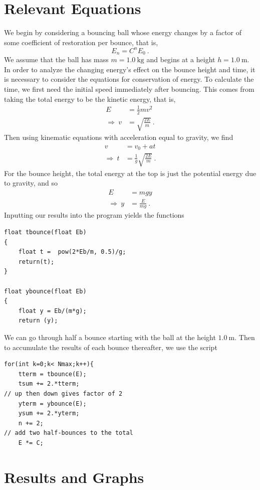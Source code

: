 \documentclass[aps,prl,twocolumn,superscriptaddress]{revtex4-1}
\begin{document}
\section{Relevant Equations}
We begin by considering a bouncing ball whose energy changes by a factor of some coefficient of restoration per bounce, that is,
\begin{equation}
	E_n = C^n E_0 ~.
\end{equation}
We assume that the ball has mass $m = \SI{1.0}{\kg}$ and begins at a height $h = \SI{1.0}{\m}$. In order to analyze the changing energy's effect on the bounce height and time, it is necessary to consider the equations for conservation of energy. To calculate the time, we first need the initial speed immediately after bouncing. This comes from taking the total energy to be the kinetic energy, that is,
\begin{align}
	E &= \frac{1}{2}mv^2 \\
	\Rightarrow ~ v &= \sqrt{\frac{2E}{m}} ~.
\end{align}
Then using kinematic equations with acceleration equal to gravity, we find
\begin{align}
	v &= v_0 + at \\
	\Rightarrow ~ t &= \frac{1}{g} \sqrt{\frac{2E}{m}} ~.
\end{align}
For the bounce height, the total energy at the top is just the potential energy due to gravity, and so
\begin{align}
	E &= mgy \\
	\Rightarrow ~ y &= \frac{E}{mg} ~.
\end{align}
Inputting our results into the program yields the functions
\begin{lstlisting}
float tbounce(float Eb) 
{
    float t =  pow(2*Eb/m, 0.5)/g;
    return(t);
}

float ybounce(float Eb)
{
    float y = Eb/(m*g);
    return (y);
\end{lstlisting}
We can go through half a bounce starting with the ball at the height $\SI{1.0}{\m}$. Then to accumulate the results of each bounce thereafter, we use the script
\begin{lstlisting}
for(int k=0;k< Nmax;k++){
    tterm = tbounce(E);
    tsum += 2.*tterm; 
// up then down gives factor of 2
    yterm = ybounce(E);
    ysum += 2.*yterm;
    n += 2;  
// add two half-bounces to the total
    E *= C;
\end{lstlisting}

\section{Results and Graphs}
\end{document}
